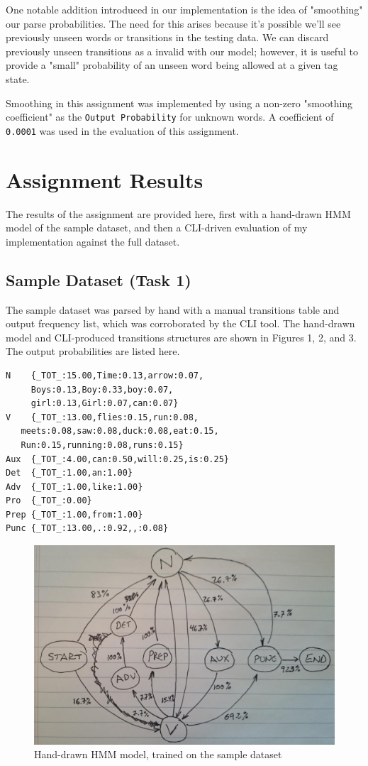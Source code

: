 \documentclass[11pt]{article}
\begin{document}
One notable addition introduced in our implementation is the idea of "smoothing"
our parse probabilities.  The need for this arises because it's possible we'll
see previously unseen words or transitions in the testing data.  We can discard
previously unseen transitions as a invalid with our model; however, it is useful
to provide a "small" probability of an unseen word being allowed at a given tag
state.

Smoothing in this assignment was implemented by using a non-zero "smoothing coefficient"
as the \texttt{Output Probability} for unknown words.  A coefficient of \texttt{0.0001} was used
in the evaluation of this assignment.


\section{Assignment Results}
The results of the assignment are provided here, first with a hand-drawn HMM model of the sample
dataset, and then a CLI-driven evaluation of my implementation against the full dataset.

\subsection{Sample Dataset (Task 1)}
The sample dataset was parsed by hand with a manual transitions table and output frequency list,
which was corroborated by the CLI tool.  The hand-drawn model and CLI-produced transitions
structures are shown in Figures 1, 2, and 3. The output probabilities are listed here.

\begin{lstlisting}
N    {_TOT_:15.00,Time:0.13,arrow:0.07,
     Boys:0.13,Boy:0.33,boy:0.07,
     girl:0.13,Girl:0.07,can:0.07}
V    {_TOT_:13.00,flies:0.15,run:0.08,
   meets:0.08,saw:0.08,duck:0.08,eat:0.15,
   Run:0.15,running:0.08,runs:0.15}
Aux  {_TOT_:4.00,can:0.50,will:0.25,is:0.25}
Det  {_TOT_:1.00,an:1.00}
Adv  {_TOT_:1.00,like:1.00}
Pro  {_TOT_:0.00}
Prep {_TOT_:1.00,from:1.00}
Punc {_TOT_:13.00,.:0.92,,:0.08}
\end{lstlisting}

\begin{figure}
    \centering
    \includegraphics[width=\textwidth]{img/sample_hmm.jpg}
    \caption{Hand-drawn HMM model, trained on the sample dataset}
    \label{fig:sampleHmm}
\end{figure}
\end{document}
